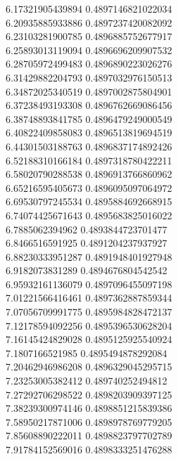 {6.17321905439894 0.4897146821022034 \\
6.20935885933886 0.4897237420082092 \\
6.23103281900785 0.4896885752677917 \\
6.25893013119094 0.4896696209907532 \\
6.28705972499483 0.4896890223026276 \\
6.31429882204793 0.4897032976150513 \\
6.34872025340519 0.4897002875804901 \\
6.37238493193308 0.4896762669086456 \\
6.38748893841785 0.4896479249000549 \\
6.40822409858083 0.4896513819694519 \\
6.44301503188763 0.4896837174892426 \\
6.52188310166184 0.4897318780422211 \\
6.58020790288538 0.4896913766860962 \\
6.65216595405673 0.4896095097064972 \\
6.69530797245534 0.4895884692668915 \\
6.74074425671643 0.4895683825016022 \\
6.7885062394962 0.4893844723701477 \\
6.8466516591925 0.4891204237937927 \\
6.88230333951287 0.4891948401927948 \\
6.9182073831289 0.4894676804542542 \\
6.95932161136079 0.4897096455097198 \\
7.01221566416461 0.4897362887859344 \\
7.07056709991775 0.4895984828472137 \\
7.12178594092256 0.4895396530628204 \\
7.16145424829028 0.4895125925540924 \\
7.1807166521985 0.4895494878292084 \\
7.20462946986208 0.4896329045295715 \\
7.23253005382412 0.489740252494812 \\
7.27292706298522 0.4898203909397125 \\
7.38239300974146 0.4898851215839386 \\
7.58950217871006 0.4898978769779205 \\
7.85608890222011 0.4898823797702789 \\
7.91784152569016 0.4898333251476288 \\
}
